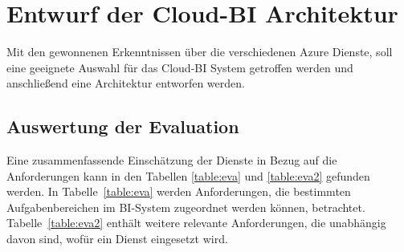 \section{Entwurf der Cloud-BI Architektur} \label{sec:entwurfBIArchitektur}
Mit den gewonnenen Erkenntnissen über die verschiedenen Azure Dienste, soll eine geeignete Auswahl für das Cloud-BI System getroffen werden und anschließend eine Architektur entworfen werden.

\subsection{Auswertung der Evaluation} \label{sec:konzeption:evaAuswertung}
 Eine zusammenfassende Einschätzung der Dienste in Bezug auf die Anforderungen kann in den Tabellen \ref{table:eva} und \ref{table:eva2} gefunden werden. In Tabelle~\ref{table:eva} werden Anforderungen, die bestimmten Aufgabenbereichen im BI-System zugeordnet werden können, betrachtet. Tabelle~\ref{table:eva2} enthält weitere relevante Anforderungen, die unabhängig davon sind, wofür ein Dienst eingesetzt wird.
 
